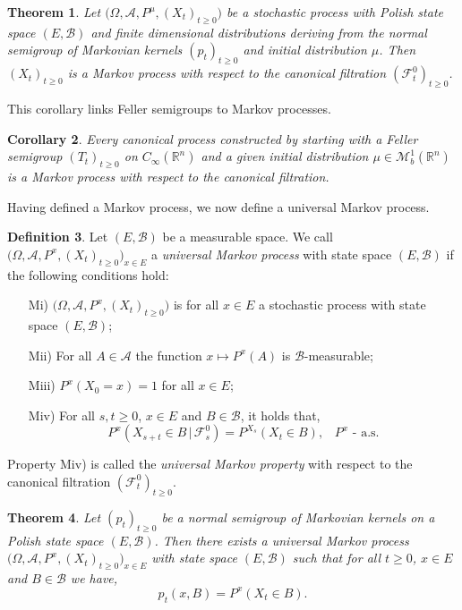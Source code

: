 \documentclass[a4paper, 12pt]{report}
\newtheorem{theorem}{Theorem}[section]
\newtheorem{cor}[theorem]{Corollary}
\theoremstyle{cor}
\theoremstyle{remark}
\theoremstyle{definition}
\newtheorem{defn}[theorem]{Definition}
\begin{document}
\begin{theorem}
Let $\big(\Omega, \mathcal{A}, P^\mu, (X_t)_{t \ge 0}\big)$ be a stochastic process with Polish state space $(E, \mathcal{B})$ and finite dimensional distributions deriving from the normal semigroup of Markovian kernels $(p_t)_{t \ge 0}$ and initial distribution $\mu$.  Then $(X_t)_{t \ge 0}$ is a Markov process with respect to the canonical filtration $(\mathcal{F}_t^0)_{t \ge 0}$.
\end{theorem}
This corollary links Feller semigroups to Markov processes.
\begin{cor}
Every canonical process constructed by starting with a Feller semigroup $(T_t)_{t \ge 0}$ on $C_\infty(\mathbb{R}^n)$ and a given initial distribution $\mu \in \mathcal{M}_b^1(\mathbb{R}^n)$ is a Markov process with respect to the canonical filtration.
\end{cor}
Having defined a Markov process, we now define a universal Markov process.

\begin{defn}
Let $(E, \mathcal{B})$ be a measurable space.  We call \\$\big(\Omega, \mathcal{A}, P^x, (X_t)_{t \ge 0}\big)_{x \in E}$ a \emph{universal Markov process} with state space $(E, \mathcal{B})$ if the following conditions hold:
\begin{itemize}

\item[Mi)] $\big(\Omega, \mathcal{A}, P^x, (X_t)_{t \ge 0}\big)$ is for all $x \in E$ a stochastic process with state space $(E, \mathcal{B})$;

\item[Mii)] For all $A \in \mathcal{A}$ the function $x \mapsto P^x(A)$ is $\mathcal{B}$-measurable;

\item[Miii)] $P^x(X_0 = x) = 1$ for all $x \in E$;

\item[Miv)] For all $s, t \ge 0$, $x \in E$ and $B \in \mathcal{B}$, it holds that,
$$
P^x(X_{s + t} \in B\,|\, \mathcal{F}_s^0) = P^{X_s}(X_t \in B), \,\,\,\,\, P^x \text{ - a.s.}
$$

\end{itemize}
Property Miv) is called the \emph{universal Markov property} with respect to the canonical filtration $(\mathcal{F}_t^0)_{t \ge 0}$.
\end{defn}

\begin{theorem}
Let $(p_t)_{t \ge 0}$ be a normal semigroup of Markovian kernels on a Polish state space $(E, \mathcal{B})$.  Then there exists a universal Markov process $\big(\Omega, \mathcal{A}, P^x, (X_t)_{t \ge 0}\big)_{x \in E}$ with state space $(E, \mathcal{B})$ such that for all $t \ge 0$, $x \in E$ and $B \in \mathcal{B}$ we have,
$$
p_t(x, B) = P^x(X_t \in B).
$$
\end{theorem}
\end{document}
